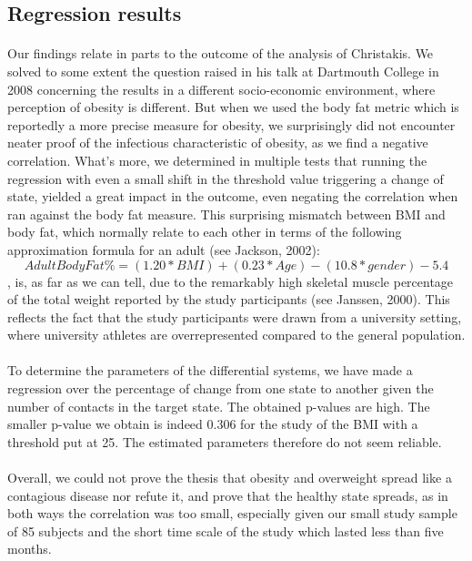 \documentclass[11pt]{article}
\begin{document}
\subsection{Regression results}
\paragraph{}
Our findings relate in parts to the outcome of the analysis of Christakis. We solved to some extent the question raised in his talk at Dartmouth College in 2008 concerning the results in a different socio-economic environment, where perception of obesity is different. But when we used the body fat metric which is reportedly a more precise measure for obesity, we surprisingly did not encounter neater proof of the infectious characteristic of obesity, as we find a negative correlation. What's more, we determined in multiple tests that running the regression with even a small shift in the threshold value triggering a change of state, yielded a great impact in the outcome, even negating the correlation when ran against the body fat measure. This surprising mismatch between BMI and body fat, which normally relate to each other in terms of the following approximation formula for an adult (see Jackson, 2002): 
\[Adult Body Fat \% = (1.20 * BMI) + (0.23 * Age) - (10.8 * gender) - 5.4\]
, is, as far as we can tell, due to the remarkably high skeletal muscle percentage of the total weight reported by the study participants (see Janssen, 2000). This reflects the fact that the study participants were drawn from a university setting, where university athletes are overrepresented compared to the general population. 

\paragraph{}
To determine the parameters of the differential systems, we have made a regression over the percentage of change from one state to another given the number of contacts in the target state. The obtained p-values are high. The smaller p-value we obtain is indeed 0.306 for the study of the BMI with a threshold put at 25. The estimated parameters therefore do not seem reliable. 

\paragraph{}

Overall, we could not prove the thesis that obesity and overweight spread like a contagious disease nor refute it, and prove that the healthy state spreads, as in both ways the correlation was too small, especially given our small study sample of 85 subjects and the short time scale of the study which lasted less than five months.
\end{document}
